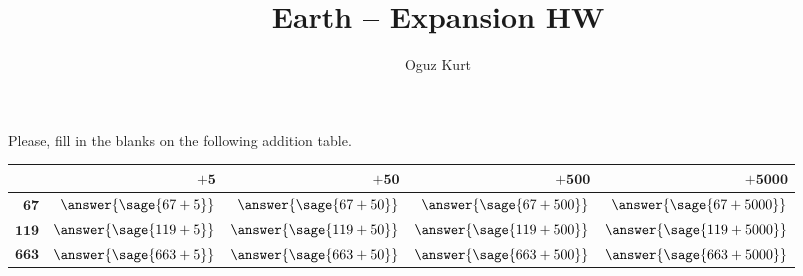 \documentclass{ximera}
\title{Earth -- Expansion HW \hfill \makebox[0.5\textwidth]{Name:\enspace\hrulefill}}
\author{Oguz Kurt}
\begin{document}
\begin{abstract}
\empty
\end{abstract}
\begin{problem}
Please, fill in the blanks on the following addition table.



\begin{center}
\begin{tabular}[s]{|r|r|r|r|r|}
\hline
&~~~~~~~ $\mathbf{+5}$ &~~~~~ $\mathbf{+50}$ &~~~~ $\mathbf{+500}$ &~~~ $\mathbf{+5000}$ 
\\ 
\hline
$\mathbf{67}$ &$\answer{\sage{67+5}}$&$\answer{\sage{67+50}}$&$\answer{\sage{67+500}}$&$\answer{\sage{67+5000}}$ 
\\
\hline
$\mathbf{119}$ &$\answer{\sage{119+5}}$&$\answer{\sage{119+50}}$&$\answer{\sage{119+500}}$&$\answer{\sage{119+5000}}$ 
\\
\hline
$\mathbf{663}$ &$\answer{\sage{663+5}}$&$\answer{\sage{663+50}}$&$\answer{\sage{663+500}}$&$\answer{\sage{663+5000}}$ 
\\
\hline
\end{tabular}
\end{center}
\end{problem}
\end{document}
